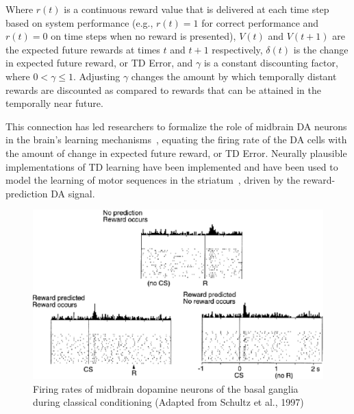 \documentclass[man]{apa}
\begin{document}
Where $r(t)$ is a continuous reward value that is delivered at each time step based on system performance (e.g., $r(t) = 1$ for correct performance and $r(t)=0$ on time steps when no reward is presented), $V(t)$ and $V(t+1)$ are the expected future rewards at times $t$ and $t+1$ respectively, \begin{math}\delta(t)\end{math} is the change in expected future reward, or TD Error, and \begin{math}\gamma\end{math} is a constant discounting factor, where \begin{math}0 < \gamma \leq 1\end{math}.  Adjusting \begin{math}\gamma\end{math} changes the amount by which temporally distant rewards are discounted as compared to rewards that can be attained in the temporally near future. 

This connection has led researchers to formalize the role of midbrain DA neurons in the brain's learning mechanisms~\cite{BartoAG:1994:TDLearning,MontaguePR:1996:Dopamine}, equating the firing rate of the DA cells with the amount of change in expected future reward, or TD Error.  Neurally plausible implementations of TD learning have been implemented and have been used to model the learning of motor sequences in the striatum~\cite{MontaguePR:1996:Dopamine}, driven by the reward-prediction DA signal.


\begin{figure}
 \includegraphics[width=15cm]{figures/schultz}
 \caption{Firing rates of midbrain dopamine neurons of the basal ganglia during classical conditioning (Adapted from Schultz et al., 1997)}
 \label{schultz}
\end{figure}
\end{document}
